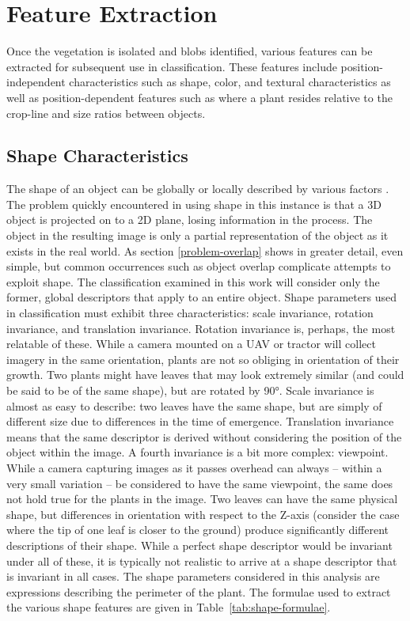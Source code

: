 \documentclass[letterpaper, notitlepage]{report}
\begin{document}
{\section{Feature Extraction}
Once the vegetation is isolated and blobs identified, various features can be extracted for subsequent use in classification. These features include position-independent characteristics such as shape, color, and textural characteristics as well as position-dependent features such as where a plant resides relative to the crop-line and size ratios between objects.  

\subsection{Shape Characteristics}
The shape of an object can be globally or locally described by various factors \parencite{Zhang2004-cm}. The problem quickly encountered in using shape in this instance is that a 3D object is projected on to a 2D plane, losing information in the process. The object in the resulting image is only a partial representation of the object as it exists in the real world. As section \ref{problem-overlap} shows in greater detail, even simple, but common occurrences such as object overlap complicate attempts to exploit shape. The classification examined in this work will consider only the former, global descriptors that apply to an entire object. Shape parameters used in classification must exhibit three characteristics: scale invariance, rotation invariance, and translation invariance. Rotation invariance is, perhaps, the most relatable of these. While a camera mounted on a \gls{UAV} or tractor will collect imagery in the same orientation, plants are not so obliging in orientation of their growth. Two plants might have leaves that may look extremely similar (and could be said to be of the same shape), but are rotated by 90\si{\degree}. Scale invariance is almost as easy to describe: two leaves have the same shape, but are simply of different size due to differences in the time of emergence. Translation invariance means that the same descriptor is derived without considering the position of the object within the image.  A fourth invariance is a bit more complex: viewpoint. While a camera capturing images as it passes overhead can always -- within a very small variation -- be considered to have the same viewpoint, the same does not hold true for the plants in the image. Two leaves can have the same physical shape, but differences in orientation with respect to the Z-axis (consider the case where the tip of one leaf is closer to the ground) produce significantly different descriptions of their shape. While a perfect shape descriptor would be invariant under all of these, it is typically not realistic to arrive at a shape descriptor that is invariant in all cases.
The shape parameters considered in this analysis are expressions describing the perimeter of the plant. The formulae used to extract the various shape features are given in Table~\ref{tab:shape-formulae}.

}
\end{document}
